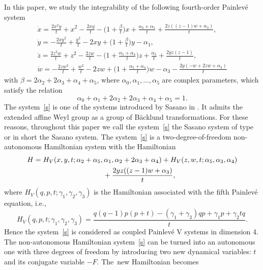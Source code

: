 \documentclass[10pt,a4paper]{amsart}
\numberwithin{equation}{section}
\begin{document}
 In this paper, we study the integrability of the following fourth-order Painlev\'{e} system
 \begin{gather}
 \dot{x} =
 \frac{2 x^2 y}{t} + x^2 - \frac{2 x y}{t}
 -\biggl(1 + \frac{\beta}{t}\biggr) x
 +\frac{\alpha_2+\alpha_5}{t} + \frac{2 z ((z-1) w + \alpha_3)}{t},\nonumber\\
 \dot{y} =
 -\frac{2 x y^2}{t} + \frac{y^2}{t} - 2 x y
 +\biggl(1 + \frac{\beta}{t}\biggr) y -\alpha_1,\nonumber\\
 \dot{z} =
 \frac{2 z^2 w}{t} + z^2 - \frac{2 z w}{t}
 -\biggl(1 + \frac{\alpha_5+\alpha_4}{t}\biggr) z
 +\frac{\alpha_5}{t} + \frac{2 y z (z-1)}{t},\nonumber\\
 \dot{w} =
 -\frac{2 z w^2}{t} + \frac{w^2}{t} - 2 z w
 +\biggl(1 + \frac{\alpha_5+\alpha_4}{t}\biggr) w - \alpha_3 -
 \frac{2 y (-w + 2 z w + \alpha_3)}{t}\label{s}
 \end{gather}
 with $\beta=2 \alpha_2+2 \alpha_3 + \alpha_4+\alpha_5$, where $\alpha_0, \alpha_1, \dots, \alpha_5$
 are complex parameters, which satisfy the relation
 \begin{equation*}
 \alpha_0+\alpha_1 + 2 \alpha_2 + 2 \alpha_3 + \alpha_4 + \alpha_5=1 .%
 \end{equation*}
 The system~\eqref{s} is one of the systems introduced by Sasano in \cite{Sa}. It admits the extended affine Weyl
 group  as a group of B\"{a}cklund transformations. For these reasons, throughout this
 paper we call the system~\eqref{s} the Sasano system of type  or in short the Sasano system.
 The system~\eqref{s} is a two-degree-of-freedom non-autonomous Hamiltonian system with the Hamiltonian
 \begin{gather}
 H = H_{V} (x, y, t; \alpha_2+\alpha_5, \alpha_1, \alpha_2 + 2 \alpha_3 +\alpha_4) +
 H_{V} (z, w, t; \alpha_5, \alpha_3, \alpha_4) \nonumber\\
 \hphantom{H =}{} +
 \frac{2 y z ((z-1) w + \alpha_3)}{t} ,\label{H51}
 \end{gather}
 where $H_{V}(q, p, t; \gamma_1, \gamma_2, \gamma_3)$ is the Hamiltonian associated with the fifth Painlev\'{e} equation,
 i.e.,
 \[
 H_{V}(q, p, t ; \gamma_1, \gamma_2, \gamma_3)=
 \frac{q (q-1) p (p+t) - (\gamma_1+\gamma_3) q p + \gamma_1 p + \gamma_2 t q}{t} .
 \]
 Hence the system~\eqref{s} is considered as coupled Painlev\'{e} V systems in dimension 4. The
 non-autonomous Hamiltonian system~\eqref{s} can be turned into an autonomous one with three degrees of freedom
 by introducing two new dynamical variables: $t$ and its conjugate variable $-F$. The~new Hamiltonian becomes
\end{document}
